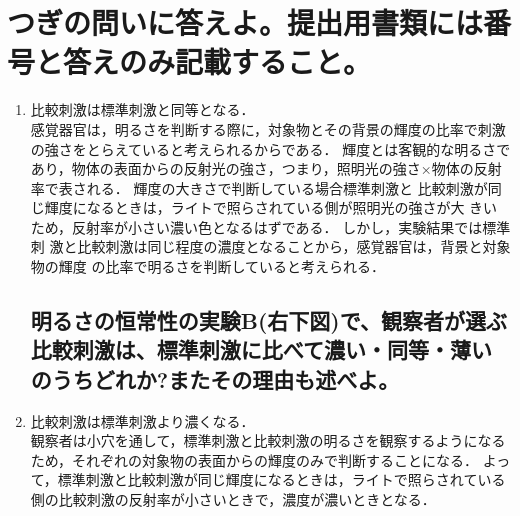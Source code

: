 \documentclass[titlepage,a4paper]{jsarticle}
\begin{document}
\section{つぎの問いに答えよ。提出用書類には番号と答えのみ記載すること。}%
\begin{enumerate}
      \subsection{明るさの恒常性の実験A(左下図)で、観察者が選ぶ比較刺激は、標準刺激に比べて濃い・同等・薄いのうちどれか?またその理由も述べよ。}
      \item 比較刺激は標準刺激と同等となる． \\
            感覚器官は，明るさを判断する際に，対象物とその背景の輝度の比率で刺激の強さをとらえていると考えられるからである．
            輝度とは客観的な明るさであり，物体の表面からの反射光の強さ，つまり，照明光の強さ×物体の反射率で表される．
            輝度の大きさで判断している場合標準刺激と 比較刺激が同じ輝度になるときは，ライトで照らされている側が照明光の強さが大 きいため，反射率が小さい濃い色となるはずである．
            しかし，実験結果では標準刺 激と比較刺激は同じ程度の濃度となることから，感覚器官は，背景と対象物の輝度 の比率で明るさを判断していると考えられる．
            \subsection{明るさの恒常性の実験B(右下図)で、観察者が選ぶ比較刺激は、標準刺激に比べて濃い・同等・薄いのうちどれか?またその理由も述べよ。}
      \item 比較刺激は標準刺激より濃くなる． \\
            観察者は小穴を通して，標準刺激と比較刺激の明るさを観察するようになるため，それぞれの対象物の表面からの輝度のみで判断することになる．
            よって，標準刺激と比較刺激が同じ輝度になるときは，ライトで照らされている側の比較刺激の反射率が小さいときで，濃度が濃いときとなる．
\end{enumerate}
\end{document}
